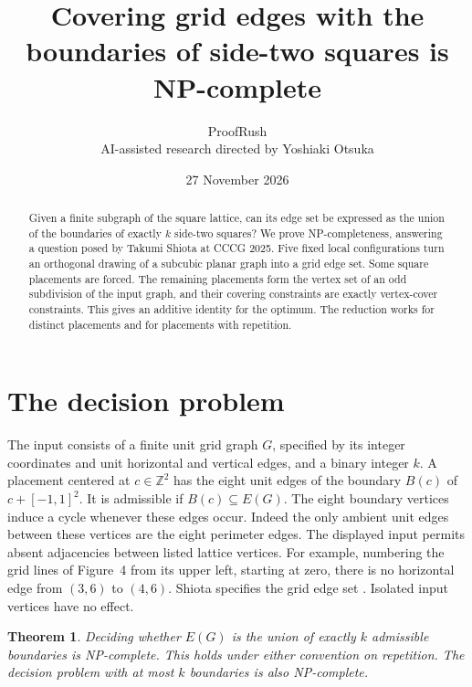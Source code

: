 \documentclass[11pt]{article}
\title{Covering grid edges with the boundaries of side-two squares is NP-complete}
\author{ProofRush\\\small AI-assisted research directed by Yoshiaki Otsuka}
\date{27 November 2026}
\newtheorem{theorem}{Theorem}
\newcommand{\Z}{\mathbb Z}
\begin{document}
\maketitle
\begin{abstract}
Given a finite subgraph of the square lattice, can its edge set be expressed as the union of the boundaries of exactly \(k\) side-two squares? We prove NP-completeness, answering a question posed by Takumi Shiota at CCCG 2025. Five fixed local configurations turn an orthogonal drawing of a subcubic planar graph into a grid edge set. Some square placements are forced. The remaining placements form the vertex set of an odd subdivision of the input graph, and their covering constraints are exactly vertex-cover constraints. This gives an additive identity for the optimum. The reduction works for distinct placements and for placements with repetition.
\end{abstract}

\section{The decision problem}
The input consists of a finite unit grid graph \(G\), specified by its integer coordinates and unit horizontal and vertical edges, and a binary integer \(k\). A placement centered at \(c\in\Z^2\) has the eight unit edges of the boundary \(B(c)\) of \(c+[-1,1]^2\). It is admissible if \(B(c)\subseteq E(G)\). The eight boundary vertices induce a cycle whenever these edges occur. Indeed the only ambient unit edges between these vertices are the eight perimeter edges. The displayed input permits absent adjacencies between listed lattice vertices. For example, numbering the grid lines of Figure~4 from its upper left, starting at zero, there is no horizontal edge from \((3,6)\) to \((4,6)\). Shiota specifies the grid edge set \cite{shiota}. Isolated input vertices have no effect.

\begin{theorem}\label{thm:main}
Deciding whether \(E(G)\) is the union of exactly \(k\) admissible boundaries is NP-complete. This holds under either convention on repetition. The decision problem with at most \(k\) boundaries is also NP-complete.
\end{theorem}
\end{document}
